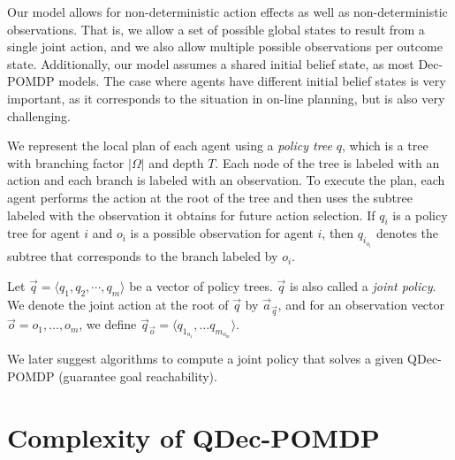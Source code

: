 \documentclass[letterpaper]{article}
\theoremstyle{definition}
\begin{document}
Our model allows for non-deterministic action effects as well as non-deterministic observations. That is, we allow a set of possible global states to result from a single joint action, and we also allow multiple possible observations per outcome state.
Additionally, our model assumes a shared initial belief state, as most Dec-POMDP models. The case where agents have different initial belief states is very important, as it corresponds to the situation in on-line planning, but is also very challenging.

We represent the local plan of each agent using a \emph{policy tree} $q$, which is a tree with branching factor $|\Omega|$ and depth $T$.  Each node of the tree is labeled with an action and each branch is labeled with an observation.  To execute the plan, each agent performs the action at the root of the tree and then uses the subtree labeled with the observation it obtains for future action selection.
If $q_i$ is a policy tree for agent $i$ and $o_i$ is a possible observation for agent $i$, then $q_{i_{o_i}}$ denotes the subtree that corresponds to the branch labeled by $o_i$.

Let $\vec{q} = \langle  q_1, q_2, \cdots, q_m \rangle$ be a vector of policy trees.  $\vec{q}$ is also called a {\em joint policy}.
We denote the joint action at the root of $\vec{q}$ by $\vec{a}_{\vec{q}}$, and for an observation vector
$\vec{o}=o_1,\ldots, o_m$, we define $\vec{q}_{\vec{o}}= \langle  q_{1_{o_1}},\ldots q_{m_{o_m}}\rangle$.

We later suggest algorithms to compute a joint policy that solves a given QDec-POMDP (guarantee goal reachability).

\section{Complexity of QDec-POMDP}
\end{document}
